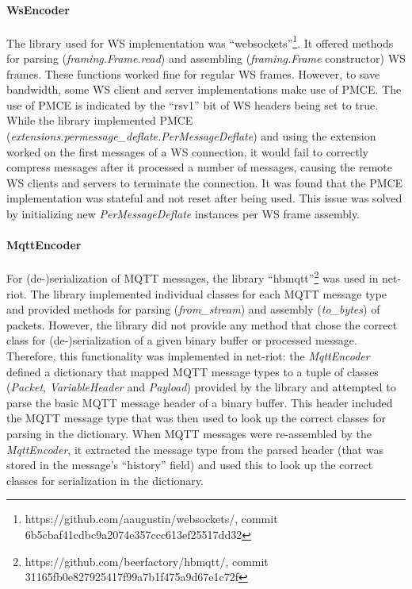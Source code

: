 \paragraph{WsEncoder} The library used for \ac{WS} implementation was \enquote{websockets}\footnote{https://github.com/aaugustin/websockets/, commit 6b5cbaf41cdbc9a2074e357ccc613ef25517dd32}. It offered methods for parsing (\emph{framing.Frame.read}) and assembling (\emph{framing.Frame} constructor) \ac{WS} frames. These functions worked fine for regular \ac{WS} frames. However, to save bandwidth, some \ac{WS} client and server implementations make use of \ac{PMCE}. The use of \ac{PMCE} is indicated by the \enquote{rsv1} bit of \ac{WS} headers being set to true. While the library implemented \ac{PMCE} (\emph{extensions.permessage\_deflate.PerMessageDeflate}) and using the extension worked on the first messages of a \ac{WS} connection, it would fail to correctly compress messages after it processed a number of messages, causing the remote \ac{WS} clients and servers to terminate the connection. It was found that the \ac{PMCE} implementation was stateful and not reset after being used. This issue was solved by initializing new \emph{PerMessageDeflate} instances per \ac{WS} frame assembly.
\paragraph{MqttEncoder} For (de-)serialization of \ac{MQTT} messages, the library \enquote{hbmqtt}\footnote{https://github.com/beerfactory/hbmqtt/, commit 31165fb0e827925417f99a7b1f475a9d67e1c72f} was used in net-riot. The library implemented individual classes for each \ac{MQTT} message type and provided methods for parsing (\emph{from\_stream}) and assembly (\emph{to\_bytes}) of packets. However, the library did not provide any method that chose the correct class for (de-)serialization of a given binary buffer or processed message. Therefore, this functionality was implemented in net-riot: the \emph{MqttEncoder} defined a dictionary that mapped \ac{MQTT} message types to a tuple of classes (\emph{Packet}, \emph{VariableHeader} and \emph{Payload}) provided by the library and attempted to parse the basic \ac{MQTT} message header of a binary buffer. This header included the \ac{MQTT} message type that was then used to look up the correct classes for parsing in the dictionary. When \ac{MQTT} messages were re-assembled by the \emph{MqttEncoder}, it extracted the message type from the parsed header (that was stored in the message's \enquote{history} field) and used this to look up the correct classes for serialization in the dictionary.

